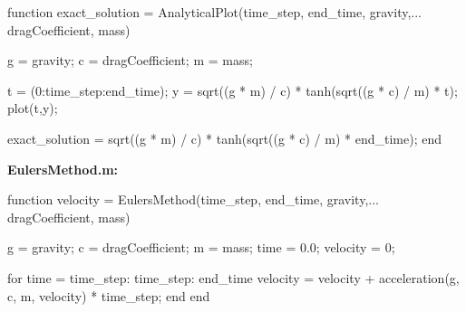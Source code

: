\documentclass[12pt]{article}
\begin{document}
\begin{verbatimtab}
function exact_solution = AnalyticalPlot(time_step, end_time, gravity,...
                                         dragCoefficient, mass)
                                     

    g = gravity;            %
    c = dragCoefficient;    %
    m = mass;               %
 
    t = (0:time_step:end_time);
    y = sqrt((g * m) / c) * tanh(sqrt((g * c) / m) * t);
    plot(t,y);
    
    exact_solution = sqrt((g * m) / c) * tanh(sqrt((g * c) / m) * end_time);
end
\end{verbatimtab}
\textbf{EulersMethod.m:}
\begin{verbatimtab}
function velocity = EulersMethod(time_step, end_time, gravity,... 
                                 dragCoefficient, mass)
                             

    g = gravity;            %
    c = dragCoefficient;    %
    m = mass;               %
    time = 0.0;             %
    velocity = 0;           %
    

    for time = time_step: time_step: end_time
        velocity = velocity + acceleration(g, c, m, velocity) * time_step;
    end
end
\end{verbatimtab}
\end{document}
